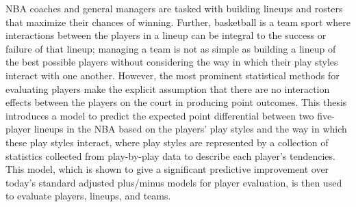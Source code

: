 
NBA coaches and general managers are tasked with building lineups and rosters that
maximize their chances of winning. Further, basketball is a team sport where
interactions between the players in a lineup can be integral to the success or
failure of that lineup; managing a team is not as simple as building a lineup of the
best possible players without considering the way in which their play styles
interact with one another. However, the most prominent statistical methods for
evaluating players make the explicit assumption that there are no interaction
effects between the players on the court in producing point outcomes. This thesis
introduces a model to predict the expected point differential between two
five-player lineups in the NBA based on the players' play styles and the way in
which these play styles interact, where play styles are represented by a collection
of statistics collected from play-by-play data to describe each player's tendencies.
This model, which is shown to give a significant predictive improvement over today's
standard adjusted plus/minus models for player evaluation, is then used to evaluate
players, lineups, and teams.
